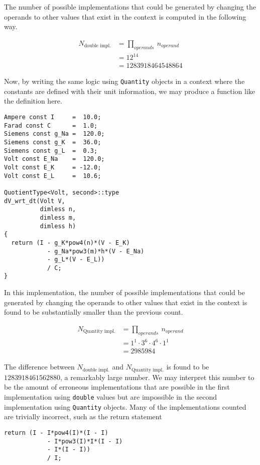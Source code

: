 \documentclass[reprint]{revtex4-1}
\begin{document}
The number of possible implementations that could be generated by changing the operands to other values
that exist in the context is computed in the following way.

\begin{align*}
  N_{\text{double impl.}} & = \prod_{operands} \: n_{operand} \\
  & = 12^{14} \\
  & = 1283918464548864
\end{align*}

Now, by writing the same logic using \verb|Quantity| objects in a context where the constants are defined
with their unit information, we may produce a function like the definition here.

\begin{verbatim}
Ampere const I     =  10.0;
Farad const C      =  1.0;
Siemens const g_Na =  120.0;
Siemens const g_K  =  36.0;
Siemens const g_L  =  0.3;
Volt const E_Na    =  120.0;
Volt const E_K     = -12.0;
Volt const E_L     =  10.6;
    
QuotientType<Volt, second>::type
dV_wrt_dt(Volt V,
          dimless n,
          dimless m,
          dimless h)
{
  return (I - g_K*pow4(n)*(V - E_K)
            - g_Na*pow3(m)*h*(V - E_Na)
            - g_L*(V - E_L))
            / C;
}
\end{verbatim}
In this implementation, the number of possible implementations that could be generated by changing
the operands to other values that exist in the context is found to be substantially smaller than the
previous count.

\begin{align*}
  N_{\text{Quantity impl.}} & = \prod_{operands} \: n_{operand} \\
  & = 1^1 \cdot 3^6 \cdot 4^6 \cdot 1^1 \\
  & = 2985984
\end{align*}

The difference between $N_{\text{double impl.}}$ and $N_{\text{Quantity impl.}}$ is found to be $1283918461562880$, a
remarkably large number. We may interpret this number to be the amount of erroneous implementations that are
possible in the first implementation using \verb|double| values but are impossible in the second implementation
using \verb|Quantity| objects. Many of the implementations counted are trivially incorrect, such as the return
statement

\begin{verbatim}
return (I - I*pow4(I)*(I - I)
            - I*pow3(I)*I*(I - I)
            - I*(I - I))
            / I;
\end{verbatim}
\end{document}
